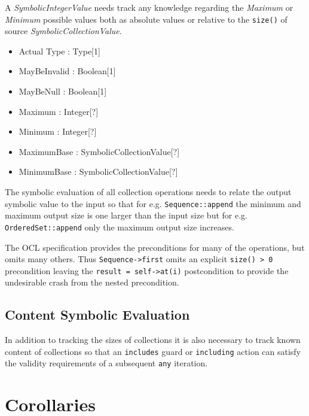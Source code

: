 \documentclass{llncs}
\begin{document}
A \emph{SymbolicIntegerValue} needs track any knowledge regarding the \emph{Maximum} or \emph{Minimum} possible values both as absolute values or relative to the \verb|size()| of source \emph{SymbolicCollectionValue}. 

\begin{itemize}
	\item Actual Type : Type[1]
	\item MayBeInvalid : Boolean[1]
	\item MayBeNull : Boolean[1]
    \item Maximum : Integer[?]
	\item Minimum : Integer[?]
    \item MaximumBase : SymbolicCollectionValue[?]
    \item MinimumBase : SymbolicCollectionValue[?]
\end{itemize}  

The symbolic evaluation of all collection operations needs to relate the output symbolic value to the input so that for e.g. \verb|Sequence::append| the minimum and maximum output size is one larger than the input size but for e.g.
\verb|OrderedSet::append| only the maximum output size increases.

The OCL specification provides the preconditions for many of the operations, but omits many others. Thus \verb|Sequence->first| omits an explicit \verb|size() > 0| precondition leaving the \verb|result = self->at(i)| postcondition to provide the undesirable crash from the nested precondition.

\subsection{Content Symbolic Evaluation}

In addition to tracking the sizes of collections it is also necessary to track known content of collections so that an \verb|includes| guard or \verb|including| action can satisfy the validity requirements of a subsequent \verb|any| iteration.


\section{Corollaries}\label{Corollaries}
\end{document}

